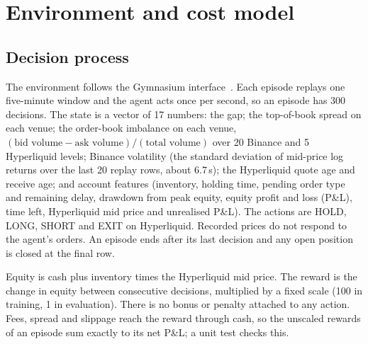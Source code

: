 \documentclass[12pt,a4paper]{article}
\begin{document}
\section{Environment and cost model}\label{sec:env}

\subsection{Decision process}
The environment follows the Gymnasium interface~\cite{gym}. Each episode replays one
five-minute window and the agent acts once per second, so an episode has 300 decisions. The
state is a vector of 17 numbers: the gap; the top-of-book spread on each venue; the order-book
imbalance on each venue, $(\text{bid volume}-\text{ask volume})/(\text{total volume})$ over 20
Binance and 5 Hyperliquid levels; Binance volatility (the standard deviation of mid-price log
returns over the last 20 replay rows, about 6.7\,s); the Hyperliquid quote age and receive
age; and account features (inventory, holding time, pending order type and remaining
delay, drawdown from peak equity, equity profit and loss (P\&L), time left, Hyperliquid mid
price and unrealised P\&L). The actions are HOLD, LONG, SHORT and EXIT on Hyperliquid.
Recorded prices do not respond to the agent's orders. An episode ends after its last
decision and any open position is closed at the final row.

Equity is cash plus inventory times the Hyperliquid mid price. The reward is the change in
equity between consecutive decisions, multiplied by a fixed scale (100 in training, 1 in
evaluation). There is no bonus or penalty attached to any action. Fees, spread and slippage
reach the reward through cash, so the unscaled rewards of an episode sum exactly to its
net P\&L; a unit test checks this.
\end{document}
